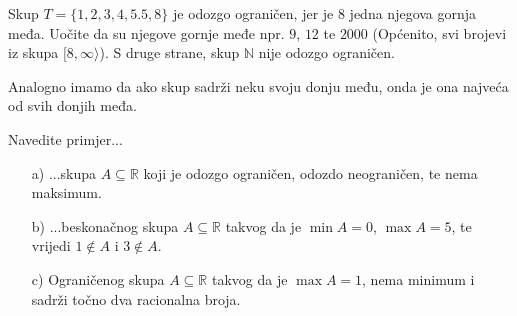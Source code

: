 \begin{exmp}
Skup $T=\{1, 2, 3, 4, 5.5, 8\}$ je odozgo ograničen, jer je $8$ jedna njegova gornja međa. Uočite da su njegove gornje međe npr. $9$, $12$ te $2000$ (Općenito, svi brojevi iz skupa $[8,\infty\rangle$). S druge strane, skup $\mathbb{N}$ nije odozgo ograničen. 

Analogno imamo da ako skup sadrži neku svoju donju među, onda je ona najveća od svih donjih međa.
\end{exmp}
\begin{exercise} Navedite primjer...
\begin{itemize}
\item[a)] ...skupa $A\subseteq \mathbb{R}$ koji je odozgo ograničen, odozdo neograničen, te nema maksimum.
\item[b)] ...beskonačnog skupa $A\subseteq \mathbb{R}$ takvog da je $\min{A}=0$, $\max{A}=5$, te vrijedi $1\notin A$ i $3\notin A$.
\item[c)] Ograničenog skupa $A\subseteq \mathbb{R}$ takvog da je $\max{A}=1$, nema minimum i sadrži točno dva racionalna broja.
\end{itemize}
\end{exercise}
